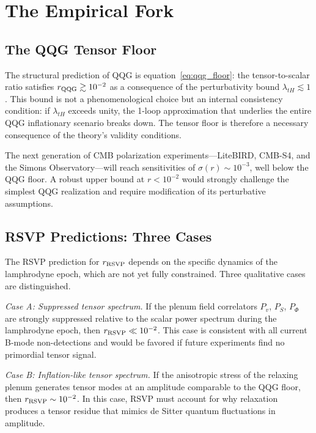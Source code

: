 \documentclass[12pt, a4paper]{article}
\newcommand{\rRSVP}{r_{\rm RSVP}}
\newcommand{\rQQG}{r_{\rm QQG}}
\begin{document}
\section{The Empirical Fork}
\label{sec:fork}

\subsection{The QQG Tensor Floor}

The structural prediction of QQG is equation~\eqref{eq:qqg_floor}: the
tensor-to-scalar ratio satisfies $\rQQG \gtrsim 10^{-2}$ as a consequence of the
perturbativity bound $\lambda_{tH} \lesssim 1$. This bound is not a
phenomenological choice but an internal consistency condition: if $\lambda_{tH}$
exceeds unity, the 1-loop approximation that underlies the entire QQG inflationary
scenario breaks down. The tensor floor is therefore a necessary consequence of the
theory's validity conditions.

The next generation of CMB polarization experiments---LiteBIRD, CMB-S4, and the
Simons Observatory---will reach sensitivities of $\sigma(r) \sim 10^{-3}$, well
below the QQG floor. A robust upper bound at $r < 10^{-2}$ would strongly challenge the simplest QQG
realization and require modification of its perturbative assumptions.

\subsection{RSVP Predictions: Three Cases}

The RSVP prediction for $\rRSVP$ depends on the specific dynamics of the
lamphrodyne epoch, which are not yet fully constrained. Three qualitative cases
are distinguished.

\textit{Case A: Suppressed tensor spectrum.} If the plenum field correlators
$P_v$, $P_S$, $P_\Phi$ are strongly suppressed relative to the scalar power
spectrum during the lamphrodyne epoch, then $\rRSVP \ll 10^{-2}$. This case is
consistent with all current B-mode non-detections and would be favored if
future experiments find no primordial tensor signal.

\textit{Case B: Inflation-like tensor spectrum.} If the anisotropic stress of the
relaxing plenum generates tensor modes at an amplitude comparable to the QQG floor,
then $\rRSVP \sim 10^{-2}$. In this case, RSVP must account for why relaxation
produces a tensor residue that mimics de Sitter quantum fluctuations in amplitude.
\end{document}
